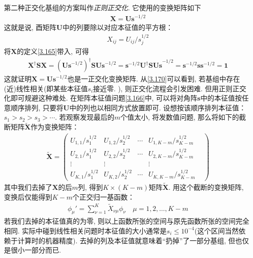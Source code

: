 第二种正交化基组的方案叫作\emph{正则正交化}. 
它使用的变换矩阵如下
\begin{align}
	\mathbf{X=Us}^{-1/2}
\end{align}
这就是说, 
酉矩阵$\mathbf{U}$中的列要除以对应本征值的平方根：
\begin{align}
	\label{3.170}
	X_{ij} = U_{ij}/s_{j}^{1/2}
\end{align}
将$\mathbf{X}$的定义\autoref{3.165}带入, 
可得
\begin{align}
	\mathbf{X^\dagger SX} = (\mathbf{Us}^{-1/2})^\dagger\mathbf{SUs}^{-1/2} = \mathbf{s}^{-1/2}\mathbf{U^\dagger SUs}^{-1/2} = \mathbf{s}^{-1/2}\mathbf{ss}^{-1/2}=\mathbf{1}
\end{align}
这就证明$\mathbf{X=Us}^{-1/2}$也是一正交化变换矩阵. 
从\autoref{3.170}可以看到, 
若基组中存在(近)线性相关(即某些本征值$s_i$接近零.
), 
则正交化流程会引发困难. 
但用正则正交化即可规避这种难处. 
在矩阵本征值问题\autoref{3.166}中, 
可以将对角阵$\mathbf{s}$中的本征值按任意顺序排列, 
只要将$\mathbf{U}$中的列也以相同方式放置即可. 
设想按该顺序排列本征值：$s_1>s_2>s_3>\cdots$. 
若观察发现最后的$m$个值太小, 
将发数值问题, 
那么将如下的截断矩阵$\mathbf{\tilde{X}}$作为变换矩阵：
\begin{align}
	\tilde{\mathbf{X}} =
	\begin{pmatrix}
		U_{1,1}/s^{1/2}_{1} & U_{1,2}/s^{1/2}_{2} & \cdots & U_{1,K-m}/s^{1/2}_{K-m} &  \\
		U_{2,1}/s^{1/2}_{1} & U_{2,2}/s^{1/2}_{2} & \cdots & U_{2,K-m}/s^{1/2}_{K-m} &  \\
		\vdots              & \vdots              &        & \vdots                  &  \\
		U_{K,1}/s^{1/2}_{1} & U_{K,2}/s^{1/2}_{2} & \cdots & U_{K,K-m}/s^{1/2}_{K-m} &
	\end{pmatrix}
\end{align}
其中我们去掉了$\mathbf{X}$的后$m$列, 
得到$K\times (K-m)$矩阵$\tilde{\mathbf{X}}$. 
用这个截断的变换矩阵, 
变换后仅能得到$K-m$个正交归一基函数：
\begin{align}
	\phi_\mu' = \sum_{\nu=1}^{K}\tilde{X}_{\nu\mu}\phi_\nu\quad\mu=1,2,\ldots,K-m
\end{align}
若我们去掉的本征值真的为零, 
则以上函数所张的空间与原先函数所张的空间完全相同. 
实际中碰到线性相关问题时本征值的大小通常是$s_i\leqslant 10^{-4}$(这个区间当然依赖于计算时的机器精度). 
去掉的列及本征值就意味着``扔掉''了一部分基组, 
但也仅是很小一部分而已.


